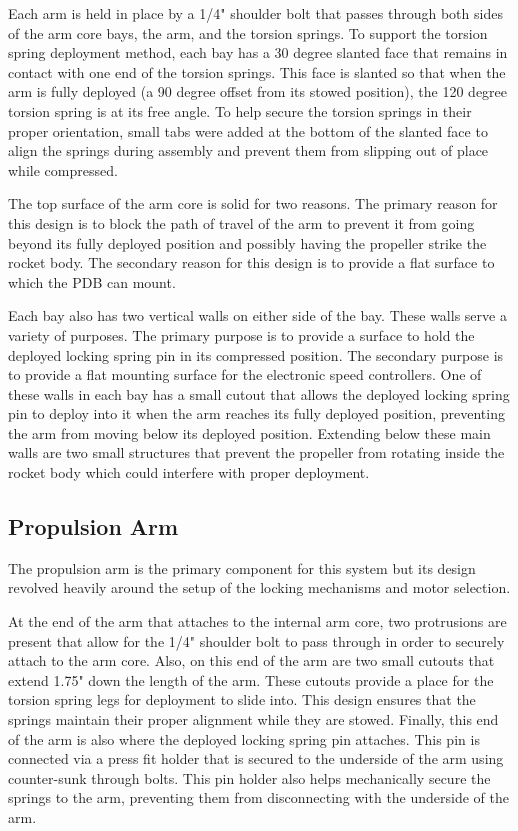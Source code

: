 Each arm is held in place by a 1/4" shoulder bolt that passes through both sides of the arm core bays, the arm, and the torsion springs. To support the torsion spring deployment method, each bay has a 30 degree slanted face that remains in contact with one end of the torsion springs. This face is slanted so that when the arm is fully deployed (a 90 degree offset from its stowed position), the 120 degree torsion spring is at its free angle. To help secure the torsion springs in their proper orientation, small tabs were added at the bottom of the slanted face to align the springs during assembly and prevent them from slipping out of place while compressed.

The top surface of the arm core is solid for two reasons. The primary reason for this design is to block the path of travel of the arm to prevent it from going beyond its fully deployed position and possibly having the propeller strike the rocket body. The secondary reason for this design is to provide a flat surface to which the PDB can mount.

Each bay also has two vertical walls on either side of the bay. These walls serve a variety of purposes. The primary purpose is to provide a surface to hold the deployed locking spring pin in its compressed position. The secondary purpose is to provide a flat mounting surface for the electronic speed controllers. One of these walls in each bay has a small cutout that allows the deployed locking spring pin to deploy into it when the arm reaches its fully deployed position, preventing the arm from moving below its deployed position. Extending below these main walls are two small structures that prevent the propeller from rotating inside the rocket body which could interfere with proper deployment.

\subsection{Propulsion Arm}
The propulsion arm is the primary component for this system but its design revolved heavily around the setup of the locking mechanisms and motor selection. 

At the end of the arm that attaches to the internal arm core, two protrusions are present that allow for the 1/4" shoulder bolt to pass through in order to securely attach to the arm core. Also, on this end of the arm are two small cutouts that extend 1.75" down the length of the arm. These cutouts provide a place for the torsion spring legs for deployment to slide into. This design ensures that the springs maintain their proper alignment while they are stowed. Finally, this end of the arm is also where the deployed locking spring pin attaches. This pin is connected via a press fit holder that is secured to the underside of the arm using counter-sunk through bolts. This pin holder also helps mechanically secure the springs to the arm, preventing them from disconnecting with the underside of the arm.

